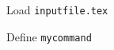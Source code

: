   Load \texttt{inputfile.tex}

  Define \texttt{mycommand}

  \def\mycommand{My macro executed \only<1>{A}\only<2>{B}\only<3>{C}}
